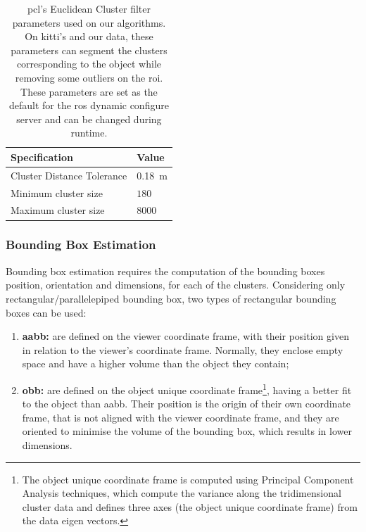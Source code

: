 \begin{table}[H]
	\centering
	\renewcommand{\arraystretch}{1.2}
	\begin{tabular}{@{}p{6cm}l@{}}
	 \toprule
	 Specification & Value \\
	 \midrule
	 Cluster Distance Tolerance & \SI{0.18}{\meter}\footnotemark \\
	 Minimum cluster size & $180$ \\
	 Maximum cluster size & $8000$ \\
	 \bottomrule
	\end{tabular}
	\caption{\ac{pcl}'s Euclidean Cluster filter parameters used on our algorithms. On \ac{kitti}'s and our data, these parameters can segment the clusters corresponding to the object while removing some outliers on the \ac{roi}. These parameters are set as the default for the \ac{ros} dynamic configure server and can be changed during runtime.}
	\label{tab:euclidian-cluster-specs}
\end{table}


\subsubsection{Bounding Box Estimation}
\label{subsubsec:object-detection:bounding-box-estimation}
Bounding box estimation requires the computation of the bounding boxes position, orientation and dimensions, for each of the clusters. Considering only rectangular/parallelepiped bounding box, two types of rectangular bounding boxes can be used:

\begin{enumerate}
	\item \textbf{\acf{aabb}:} are defined on the viewer coordinate frame, with their position given in relation to the viewer's coordinate frame. Normally, they enclose empty space and have a higher volume than the object they contain;
	\item \textbf{\acf{obb}:} are defined on the object unique coordinate frame\footnote{The object unique coordinate frame is computed using Principal Component Analysis techniques, which compute the variance along the tridimensional cluster data and defines three axes (the object unique coordinate frame) from the data eigen vectors.}, having a better fit to the object than \ac{aabb}. Their position is the origin of their own coordinate frame, that is not aligned with the viewer coordinate frame, and they are oriented to minimise the volume of the bounding box, which results in lower dimensions.
\end{enumerate}

